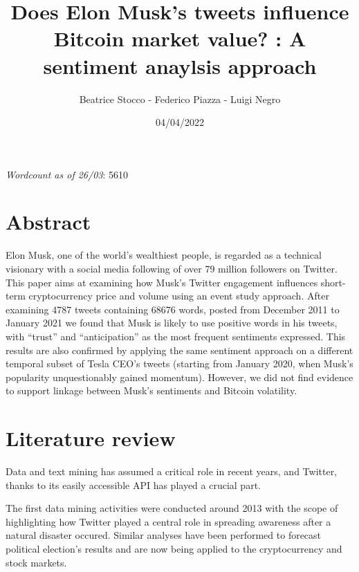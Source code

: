 \documentclass[
]{article}
\title{Does Elon Musk's tweets influence Bitcoin market value? : A
sentiment anaylsis approach}
\author{Beatrice Stocco - Federico Piazza - Luigi Negro}
\date{04/04/2022}
\begin{document}
\maketitle

\emph{Wordcount as of 26/03}: 5610

\hypertarget{abstract}{%
\section{Abstract}\label{abstract}}

Elon Musk, one of the world's wealthiest people, is regarded as a
technical visionary with a social media following of over 79 million
followers on Twitter. This paper aims at examining how Musk's Twitter
engagement influences short-term cryptocurrency price and volume using
an event study approach. After examining 4787 tweets containing 68676
words, posted from December 2011 to January 2021 we found that Musk is
likely to use positive words in his tweets, with ``trust'' and
``anticipation'' as the most frequent sentiments expressed. This results
are also confirmed by applying the same sentiment approach on a
different temporal subset of Tesla CEO's tweets (starting from January
2020, when Musk's popularity unquestionably gained momentum). However,
we did not find evidence to support linkage between Musk's sentiments
and Bitcoin volatility.

\hypertarget{literature-review}{%
\section{Literature review}\label{literature-review}}

Data and text mining has assumed a critical role in recent years, and
Twitter, thanks to its easily accessible API has played a crucial part.

The first data mining activities were conducted around 2013 with the
scope of highlighting how Twitter played a central role in spreading
awareness after a natural disaster
occured\autocite{gunawongSocialNetworkReactions2013}. Similar analyses
have been performed to forecast political election's
results\autocite{hubertyCanWeVote2015} and are now being applied to the
cryptocurrency and stock markets.
\end{document}

